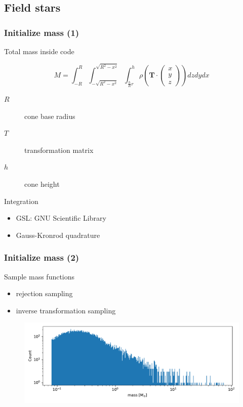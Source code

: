 \documentclass{beamer}
\begin{document}
\subsection{Field stars}

\begin{frame}
\frametitle{Initialize mass (1)}
 Total mass inside code

\begin{equation*}
M = \int_{-R}^{R}\int_{-\sqrt{R^2-x^2}}^{\sqrt{R^2-x^2}}\int_{\frac{h}{R}r}^{h} \rho \left ( \mathbf{T} \cdot \begin{pmatrix}x\\ y\\ z\end{pmatrix} \right ) dzdydx
\end{equation*}

\begin{description}
\item[\(R\)] cone base radius
\item[\(T\)] transformation matrix
\item[\(h\)] cone height
\end{description}

Integration

\begin{itemize}
\item GSL: GNU Scientific Library
\item Gauss-Kronrod quadrature
\end{itemize}

\end{frame}


\begin{frame}
\frametitle{Initialize mass (2)}

Sample mass functions

\begin{itemize}
\item rejection sampling
\item inverse transformation sampling
\end{itemize}

\begin{figure}
\centering
\includegraphics[width=\linewidth]{Images/initial_conditions_mass_bulge.pdf}
\end{figure}

\end{frame}
\end{document}
